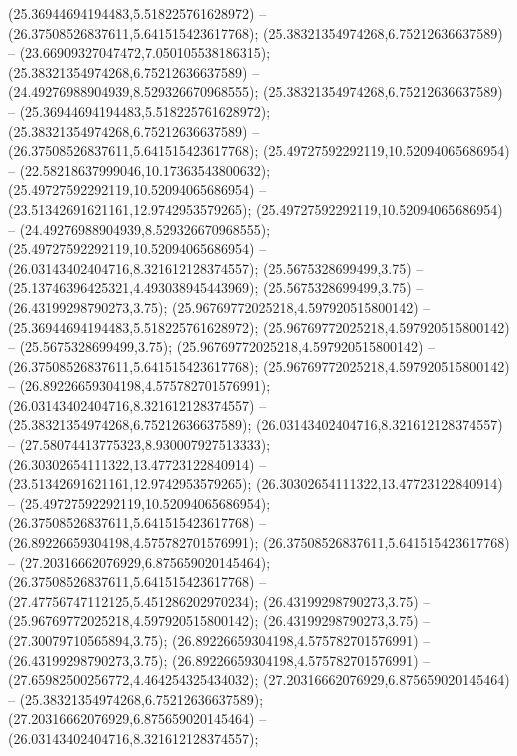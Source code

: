  (25.36944694194483,5.518225761628972) -- (26.37508526837611,5.641515423617768);
 (25.38321354974268,6.75212636637589) -- (23.66909327047472,7.050105538186315);
 (25.38321354974268,6.75212636637589) -- (24.49276988904939,8.529326670968555);
 (25.38321354974268,6.75212636637589) -- (25.36944694194483,5.518225761628972);
 (25.38321354974268,6.75212636637589) -- (26.37508526837611,5.641515423617768);
 (25.49727592292119,10.52094065686954) -- (22.58218637999046,10.17363543800632);
 (25.49727592292119,10.52094065686954) -- (23.51342691621161,12.9742953579265);
 (25.49727592292119,10.52094065686954) -- (24.49276988904939,8.529326670968555);
 (25.49727592292119,10.52094065686954) -- (26.03143402404716,8.321612128374557);
 (25.5675328699499,3.75) -- (25.13746396425321,4.493038945443969);
 (25.5675328699499,3.75) -- (26.43199298790273,3.75);
 (25.96769772025218,4.597920515800142) -- (25.36944694194483,5.518225761628972);
 (25.96769772025218,4.597920515800142) -- (25.5675328699499,3.75);
 (25.96769772025218,4.597920515800142) -- (26.37508526837611,5.641515423617768);
 (25.96769772025218,4.597920515800142) -- (26.89226659304198,4.575782701576991);
 (26.03143402404716,8.321612128374557) -- (25.38321354974268,6.75212636637589);
 (26.03143402404716,8.321612128374557) -- (27.58074413775323,8.930007927513333);
 (26.30302654111322,13.47723122840914) -- (23.51342691621161,12.9742953579265);
 (26.30302654111322,13.47723122840914) -- (25.49727592292119,10.52094065686954);
 (26.37508526837611,5.641515423617768) -- (26.89226659304198,4.575782701576991);
 (26.37508526837611,5.641515423617768) -- (27.20316662076929,6.875659020145464);
 (26.37508526837611,5.641515423617768) -- (27.47756747112125,5.451286202970234);
 (26.43199298790273,3.75) -- (25.96769772025218,4.597920515800142);
 (26.43199298790273,3.75) -- (27.30079710565894,3.75);
 (26.89226659304198,4.575782701576991) -- (26.43199298790273,3.75);
 (26.89226659304198,4.575782701576991) -- (27.65982500256772,4.464254325434032);
 (27.20316662076929,6.875659020145464) -- (25.38321354974268,6.75212636637589);
 (27.20316662076929,6.875659020145464) -- (26.03143402404716,8.321612128374557);
